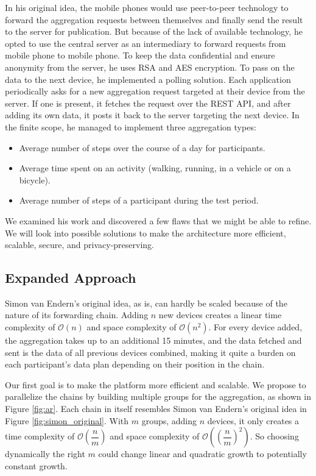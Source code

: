 In his original idea, the mobile phones would use peer-to-peer technology to forward the aggregation requests between themselves and finally send the result to the server for publication. But because of the lack of available technology, he opted to use the central server as an intermediary to forward requests from mobile phone to mobile phone. To keep the data confidential and ensure anonymity from the server, he uses RSA and AES encryption. To pass on the data to the next device, he implemented a polling solution. Each application periodically asks for a new aggregation request targeted at their device from the server. If one is present, it fetches the request over the REST API, and after adding its own data, it posts it back to the server targeting the next device.
In the finite scope, he managed to implement three aggregation types:

\begin{itemize}
    \item Average number of steps over the course of a day for participants. 
    \item Average time spent on an activity (walking, running, in a vehicle or on a bicycle).
    \item Average number of steps of a participant during the test period. 
\end{itemize}

We examined his work and discovered a few flaws that we might be able to refine. We will look into possible solutions to make the architecture more efficient, scalable, secure, and privacy-preserving.

\subsection{Expanded Approach}
Simon van Endern's original idea, as is, can hardly be scaled because of the nature of its forwarding chain. Adding \(n\) new devices creates a linear time complexity of \(\mathcal{O}(n)\) and space complexity of \(\mathcal{O}(n^2)\). For every device added, the aggregation takes up to an additional 15 minutes, and the data fetched and sent is the data of all previous devices combined, making it quite a burden on each participant's data plan depending on their position in the chain.

Our first goal is to make the platform more efficient and scalable. We propose to parallelize the chains by building multiple groups for the aggregation, as shown in Figure \ref{fig:ar}. Each chain in itself resembles Simon van Endern's original idea in Figure \ref{fig:simon_original}. With \(m\) groups, adding \(n\) devices, it only creates a time complexity of \(\mathcal{O}(\dfrac{n}{m})\) and space complexity of \(\mathcal{O}((\dfrac{n}{m})^2)\). So choosing dynamically the right \(m\) could change linear and quadratic growth to potentially constant growth. 

